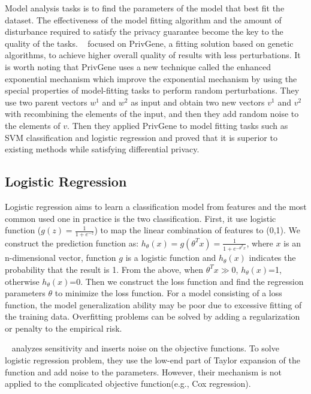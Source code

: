 \documentclass[draftclsnofoot,onecolumn,twoside]{IEEEtran}
\begin{document}
Model analysis tasks is to find the parameters of the model that best fit the dataset. The effectiveness of the model fitting algorithm and the amount of disturbance required to satisfy the privacy guarantee become the key to the quality of the tasks. ~\cite{Zhang2013PrivGene} focused on PrivGene, a fitting solution based on genetic algorithms, to achieve higher overall quality of results with less perturbations. It is worth noting that PrivGene uses a new technique called the enhanced exponential mechanism which improve the exponential mechanism by using the special properties of model-fitting tasks to perform random perturbations. They use two parent vectors $w^1$ and $w^2$ as input and obtain two new vectors $v^1$ and $v^2$ with recombining the elements of the input, and then they add random noise to the elements of $v$. Then they applied PrivGene to model fitting tasks such as SVM classification and logistic regression and proved that it is superior to existing methods while satisfying differential privacy.



\subsection{Logistic Regression}
Logistic regression aims to learn a classification model from features and the most common used one in practice is the two classification. First, it use logistic function ($g(z)=\frac{1}{1+e^{-z}}$) to map the linear combination of features to (0,1). We construct the prediction function as: $h_{\theta}(x)=g(\theta^{T}x)=\frac{1}{1+e^{-\theta^{T}x}}$, where $x$ is an n-dimensional vector, function $g$ is a logistic function and $h_{\theta}(x)$ indicates the probability that the result is 1. From the above, when $\theta^{T}x\gg0$, $h_{\theta}(x)$=1, otherwise $h_{\theta}(x)$=0. Then we construct the loss function and find the regression parameters $\theta$ to minimize the loss function. For a model consisting of a loss function, the model generalization ability may be poor due to excessive fitting of the training data. Overfitting problems can be solved by adding a regularization or penalty to the empirical risk.




~\cite{Zhang2012Functional} analyzes sensitivity and inserts noise on the objective functions. To solve logistic regression problem, they use the low-end part of Taylor expansion of the function and add noise to the parameters. However, their mechanism is not applied to the complicated objective function(e.g., Cox regression).
\end{document}

